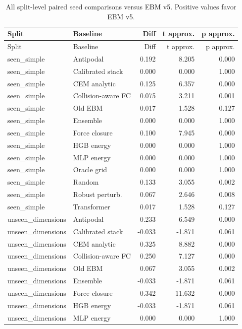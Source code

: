 {\scriptsize
\setlength{\tabcolsep}{3pt}
\begin{longtable}{llrrr}
\caption{All split-level paired seed comparisons versus EBM v5. Positive values favor EBM v5.}\label{tab:full-pairwise}\\
\toprule
Split & Baseline & Diff & t approx. & p approx. \\
\midrule
\endfirsthead
\toprule
Split & Baseline & Diff & t approx. & p approx. \\
\midrule
\endhead
seen\_simple & Antipodal & 0.192 & 8.205 & 0.000 \\
seen\_simple & Calibrated stack & 0.000 & 0.000 & 1.000 \\
seen\_simple & CEM analytic & 0.125 & 6.357 & 0.000 \\
seen\_simple & Collision-aware FC & 0.075 & 3.211 & 0.001 \\
seen\_simple & Old EBM & 0.017 & 1.528 & 0.127 \\
seen\_simple & Ensemble & 0.000 & 0.000 & 1.000 \\
seen\_simple & Force closure & 0.100 & 7.945 & 0.000 \\
seen\_simple & HGB energy & 0.000 & 0.000 & 1.000 \\
seen\_simple & MLP energy & 0.000 & 0.000 & 1.000 \\
seen\_simple & Oracle grid & 0.000 & 0.000 & 1.000 \\
seen\_simple & Random & 0.133 & 3.055 & 0.002 \\
seen\_simple & Robust perturb. & 0.067 & 2.646 & 0.008 \\
seen\_simple & Transformer & 0.017 & 1.528 & 0.127 \\
unseen\_dimensions & Antipodal & 0.233 & 6.549 & 0.000 \\
unseen\_dimensions & Calibrated stack & -0.033 & -1.871 & 0.061 \\
unseen\_dimensions & CEM analytic & 0.325 & 8.882 & 0.000 \\
unseen\_dimensions & Collision-aware FC & 0.250 & 7.127 & 0.000 \\
unseen\_dimensions & Old EBM & 0.067 & 3.055 & 0.002 \\
unseen\_dimensions & Ensemble & -0.033 & -1.871 & 0.061 \\
unseen\_dimensions & Force closure & 0.342 & 11.632 & 0.000 \\
unseen\_dimensions & HGB energy & -0.033 & -1.871 & 0.061 \\
unseen\_dimensions & MLP energy & 0.000 & 0.000 & 1.000 \\

\end{longtable}}
